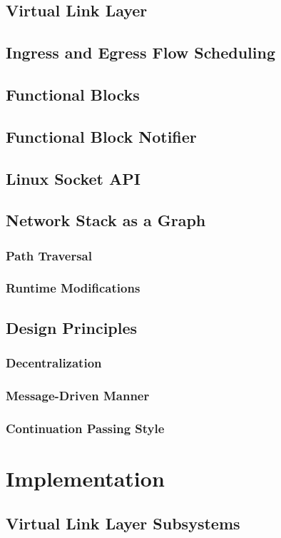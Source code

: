 \section{Virtual Link Layer}
\section{Ingress and Egress Flow Scheduling}
\section{Functional Blocks}
\section{Functional Block Notifier}
\section{Linux Socket API}
\section{Network Stack as a Graph}
\subsection{Path Traversal}
\subsection{Runtime Modifications}
\section{Design Principles}
\subsection{Decentralization}
\subsection{Message-Driven Manner}
\subsection{Continuation Passing Style}

\chapter{\label{chp:content} Implementation}
\section{Virtual Link Layer Subsystems}
